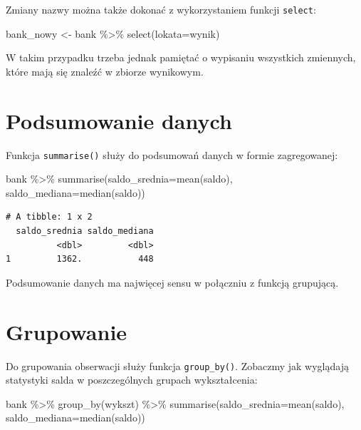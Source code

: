 \documentclass[
  letterpaper,
  DIV=11,
  numbers=noendperiod]{scrreprt}
\newenvironment{Shaded}{\begin{snugshade}}{\end{snugshade}}
\newcommand{\AttributeTok}[1]{\textcolor[rgb]{0.40,0.45,0.13}{#1}}
\newcommand{\FunctionTok}[1]{\textcolor[rgb]{0.28,0.35,0.67}{#1}}
\newcommand{\NormalTok}[1]{\textcolor[rgb]{0.00,0.23,0.31}{#1}}
\newcommand{\OtherTok}[1]{\textcolor[rgb]{0.00,0.23,0.31}{#1}}
\newcommand{\SpecialCharTok}[1]{\textcolor[rgb]{0.37,0.37,0.37}{#1}}
\begin{document}
Zmiany nazwy można także dokonać z wykorzystaniem funkcji
\texttt{select}:

\begin{Shaded}
\begin{Highlighting}[]
\NormalTok{bank\_nowy }\OtherTok{\textless{}{-}}\NormalTok{ bank }\SpecialCharTok{\%\textgreater{}\%}
  \FunctionTok{select}\NormalTok{(}\AttributeTok{lokata=}\NormalTok{wynik)}
\end{Highlighting}
\end{Shaded}

W takim przypadku trzeba jednak pamiętać o wypisaniu wszystkich
zmiennych, które mają się znaleźć w zbiorze wynikowym.

\hypertarget{podsumowanie-danych}{%
\section{Podsumowanie danych}\label{podsumowanie-danych}}

Funkcja \texttt{summarise()} służy do podsumowań danych w formie
zagregowanej:

\begin{Shaded}
\begin{Highlighting}[]
\NormalTok{bank }\SpecialCharTok{\%\textgreater{}\%}
  \FunctionTok{summarise}\NormalTok{(}\AttributeTok{saldo\_srednia=}\FunctionTok{mean}\NormalTok{(saldo),}
            \AttributeTok{saldo\_mediana=}\FunctionTok{median}\NormalTok{(saldo))}
\end{Highlighting}
\end{Shaded}

\begin{verbatim}
# A tibble: 1 x 2
  saldo_srednia saldo_mediana
          <dbl>         <dbl>
1         1362.           448
\end{verbatim}

Podsumowanie danych ma najwięcej sensu w połączniu z funkcją grupującą.

\hypertarget{grupowanie}{%
\section{Grupowanie}\label{grupowanie}}

Do grupowania obserwacji służy funkcja \texttt{group\_by()}. Zobaczmy
jak wyglądają statystyki salda w poszczególnych grupach wykształcenia:

\begin{Shaded}
\begin{Highlighting}[]
\NormalTok{bank }\SpecialCharTok{\%\textgreater{}\%}
  \FunctionTok{group\_by}\NormalTok{(wykszt) }\SpecialCharTok{\%\textgreater{}\%}
  \FunctionTok{summarise}\NormalTok{(}\AttributeTok{saldo\_srednia=}\FunctionTok{mean}\NormalTok{(saldo),}
            \AttributeTok{saldo\_mediana=}\FunctionTok{median}\NormalTok{(saldo))}
\end{Highlighting}
\end{Shaded}
\end{document}
